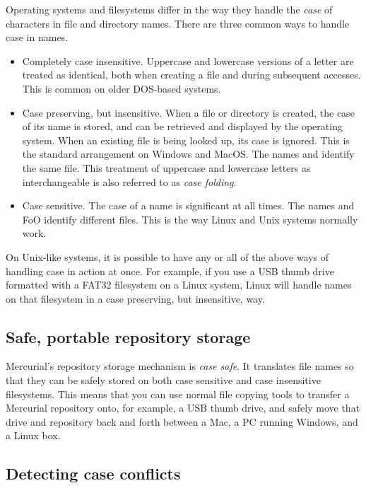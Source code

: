 Operating systems and filesystems differ in the way they handle the
\emph{case} of characters in file and directory names.  There are
three common ways to handle case in names.
\begin{itemize}
\item Completely case insensitive.  Uppercase and lowercase versions
  of a letter are treated as identical, both when creating a file and
  during subsequent accesses.  This is common on older DOS-based
  systems.
\item Case preserving, but insensitive.  When a file or directory is
  created, the case of its name is stored, and can be retrieved and
  displayed by the operating system.  When an existing file is being
  looked up, its case is ignored.  This is the standard arrangement on
  Windows and MacOS.  The names  and 
  identify the same file.  This treatment of uppercase and lowercase
  letters as interchangeable is also referred to as \emph{case
    folding}.
\item Case sensitive.  The case of a name is significant at all times.
  The names  and {FoO} identify different files.  This
  is the way Linux and Unix systems normally work.
\end{itemize}

On Unix-like systems, it is possible to have any or all of the above
ways of handling case in action at once.  For example, if you use a
USB thumb drive formatted with a FAT32 filesystem on a Linux system,
Linux will handle names on that filesystem in a case preserving, but
insensitive, way.

\subsection{Safe, portable repository storage}

Mercurial's repository storage mechanism is \emph{case safe}.  It
translates file names so that they can be safely stored on both case
sensitive and case insensitive filesystems.  This means that you can
use normal file copying tools to transfer a Mercurial repository onto,
for example, a USB thumb drive, and safely move that drive and
repository back and forth between a Mac, a PC running Windows, and a
Linux box.

\subsection{Detecting case conflicts}

